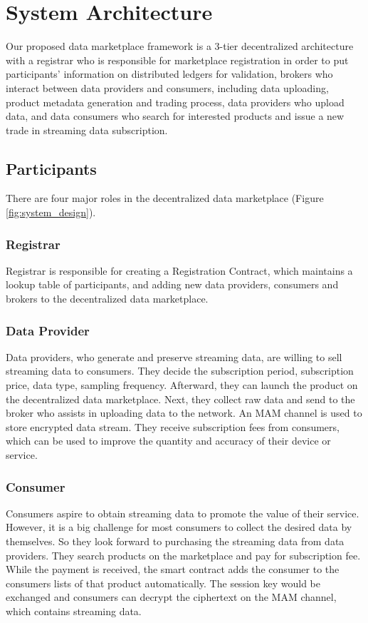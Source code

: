 \documentclass[journal,a4paper]{IEEEtran}
\begin{document}
\section{System Architecture}
Our proposed data marketplace framework is a 3-tier decentralized architecture with a registrar who is responsible for marketplace registration in order to put participants' information on distributed ledgers for validation, brokers who interact between data providers and consumers, including data uploading, product metadata generation and trading process, data providers who upload data, and data consumers who search for interested products and issue a new trade in streaming data subscription.

\subsection{Participants}
There are four major roles in the decentralized data marketplace (Figure \ref{fig:system_design}).

\subsubsection{Registrar}
Registrar is responsible for creating a Registration Contract, which maintains a lookup table of participants, and adding new data providers, consumers and brokers to the decentralized data marketplace.

\subsubsection{Data Provider}
Data providers, who generate and preserve streaming data, are willing to sell streaming data to consumers. They decide the subscription period, subscription price, data type, sampling frequency. Afterward, they can launch the product on the decentralized data marketplace. Next, they collect raw data and send to the broker who assists in uploading data to the network. An MAM channel\cite{MAM} is used to store encrypted data stream. They receive subscription fees from consumers, which can be used to improve the quantity and accuracy of their device or service.

\subsubsection{Consumer}
Consumers aspire to obtain streaming data to promote the value of their service. However, it is a big challenge for most consumers to collect the desired data by themselves. So they look forward to purchasing the streaming data from data providers. They search products on the marketplace and pay for subscription fee. While the payment is received, the smart contract adds the consumer to the consumers lists of that product automatically. The session key would be exchanged and consumers can decrypt the ciphertext on the MAM channel, which contains streaming data.
\end{document}
